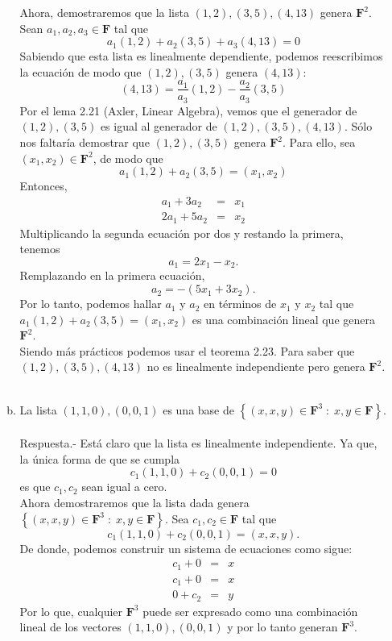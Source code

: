 \begin{enumerate}[\bfseries 1.]
\begin{enumerate}[(a)]
		Ahora, demostraremos que la lista $(1,2),(3,5),(4,13)$ genera $\textbf{F}^2$.  Sean $a_1,a_2,a_3\in \textbf{F}$ tal que
		$$a_1(1,2)+a_2(3,5)+a_3(4,13)=0$$
		Sabiendo que esta lista es linealmente dependiente, podemos reescribimos la ecuación de modo que $(1,2),(3,5)$ genera $(4,13)$:
		$$(4,13) = \dfrac{a_1}{a_3}(1,2)-\dfrac{a_2}{a_3}(3,5)$$
		Por el lema 2.21 (Axler, Linear Algebra), vemos que el generador de $(1,2),(3,5)$ es igual al generador de $(1,2),(3,5),(4,13)$. Sólo nos faltaría demostrar que $(1,2),(3,5)$ genera $\textbf{F}^2$. Para ello, sea $(x_1,x_2)\in\textbf{F}^2$, de modo que
		$$a_1(1,2)+a_2(3,5)=(x_1,x_2)$$
		Entonces,
		$$
		\begin{array}{rcl}
		    a_1+3a_2&=&x_1\\
		    2a_1+5a_2&=&x_2
		\end{array}
		$$
		Multiplicando la segunda ecuación por dos y restando la primera, tenemos
		$$a_1=2x_1-x_2.$$
		Remplazando en la primera ecuación,
		$$a_2=-(5x_1+3x_2).$$
		Por lo tanto, podemos hallar $a_1$ y $a_2$ en términos de $x_1$ y $x_2$ tal que $a_1(1,2)+a_2(3,5)=(x_1,x_2)$ es una combinación lineal que genera $\textbf{F}^2$.\\

		Siendo más prácticos podemos usar el teorema 2.23.  Para saber que $(1,2),(3,5),(4,13)$ no es linealmente independiente pero genera $\textbf{F}^2$. \\\\

	    \item La lista $(1,1,0),(0,0,1)$ es una base de $\left\{(x,x,y)\in \textbf{F}^3\; :\; x,y\in \textbf{F}\right\}$.\\\\
		Respuesta.-\; Está claro que la lista es linealmente independiente. Ya que, la única forma de que se cumpla  
		$$c_1(1,1,0)+c_2(0,0,1)=0$$
		es que $c_1,c_2$ sean igual a cero.\\
		Ahora demostraremos que la lista  dada genera $\left\{(x,x,y)\in \textbf{F}^3\; :\; x,y\in \textbf{F}\right\}$. Sea $c_1,c_2\in \textbf{F}$ tal que
		$$c_1(1,1,0)+c_2(0,0,1)=(x,x,y).$$
		De donde, podemos construir un sistema de ecuaciones como sigue:
		$$
		\begin{array}{rcl}
		    c_1+0&=&x\\
		    c_1+0&=&x\\
		    0+c_2&=&y
		\end{array}
		$$
		Por lo que, cualquier  $\textbf{F}^3$ puede ser expresado como una combinación lineal de los vectores $(1,1,0),(0,0,1)$ y por lo tanto generan $\textbf{F}^3$.\\\\ 


\end{enumerate}
\end{enumerate}
